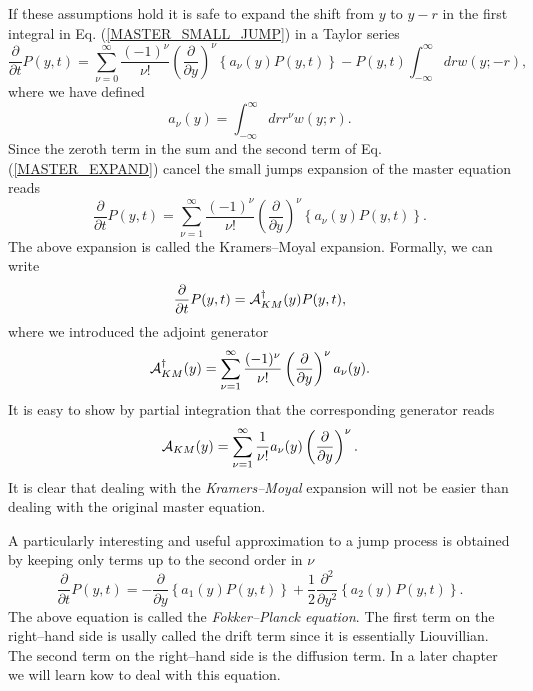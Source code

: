 If these assumptions hold it is safe to expand the shift from $y$
to $y-r$ in the first integral in 
Eq. (\ref{MASTER_SMALL_JUMP}) in a Taylor series
\begin{equation}
\label{MASTER_EXPAND}
\frac{\partial}{\partial t} P(y,t) = \sum_{\nu=0}^{\infty}
   \frac{(-1)^{\nu}}{\nu!} \left( \frac{\partial}{\partial y} 
   \right)^{\nu}
    \left\{  a_{\nu}(y) P(y,t) \right\}
    - P(y,t) \int_{-\infty}^{\infty} dr w(y;-r),
\end{equation}
where we have defined
\begin{equation*}
a_{\nu}(y) = \int_{-\infty}^{\infty} dr r^{\nu} w(y;r).
\end{equation*}
Since the zeroth term in the sum and the second term of 
Eq. (\ref{MASTER_EXPAND}) cancel the small jumps expansion 
of the master equation reads
\begin{equation}
\frac{\partial}{\partial t} P(y,t) = \sum_{\nu=1}^{\infty}
   \frac{(-1)^{\nu}}{\nu!} \left( \frac{\partial}{\partial y} 
   \right)^{\nu}
    \left\{  a_{\nu}(y) P(y,t) \right\}.
\end{equation}
The above expansion is called the Kramers--Moyal expansion. 
Formally, we can write
\begin{equation}
\frac{\partial}{\partial t} P(y,t) = {\cal{A}}_{KM}^{\dagger}(y)
         P(y,t),
\end{equation}
where we introduced the adjoint generator
\begin{equation*}
{\cal{A}}_{KM}^{\dagger}(y) = \sum_{\nu=1}^{\infty}
   \frac{(-1)^{\nu}}{\nu!} \left( \frac{\partial}{\partial y} 
   \right)^{\nu}
     a_{\nu}(y).
\end{equation*}
It is easy to show by partial integration that the corresponding
generator  reads
\begin{equation*}
{\cal{A}}_{KM}(y) = \sum_{\nu=1}^{\infty}
   \frac{1}{\nu!}  a_{\nu}(y)
    \left( \frac{\partial}{\partial y} 
   \right)^{\nu}.
\end{equation*}
It is clear that dealing with the {\em Kramers--Moyal} expansion will 
not be easier than dealing with the original master equation.

A particularly interesting and useful approximation to a jump process is 
obtained by keeping only terms up to the second order in $\nu$
\begin{equation}
\label{FOKKER_PLANCK}
\frac{\partial}{\partial t} P(y,t) =
-\frac{\partial}{\partial y} \left\{ a_1(y) P(y,t) \right\}
   + \frac{1}{2} \frac{\partial^2}{\partial y^2} 
      \left\{ a_2(y) P(y,t) \right\}.
\end{equation}
The above equation is called the {\em Fokker--Planck equation}.
The first term on the right--hand side is usally called the drift
term since it is essentially Liouvillian. The second term
on the right--hand side is the diffusion term. In a later chapter
we will learn kow to deal with this equation.

